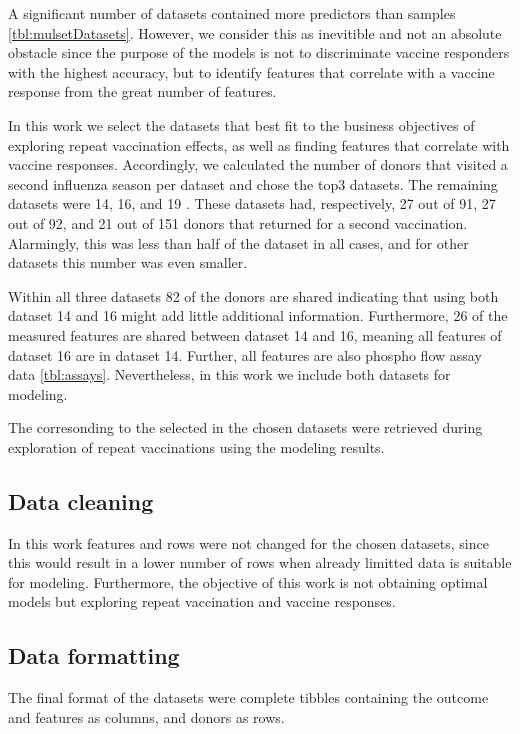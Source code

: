 A significant number of datasets contained more predictors than samples
\autoref{tbl:mulsetDatasets}. However, we consider this as inevitible and not an
absolute obstacle since the purpose of the models is not to discriminate
vaccine responders with the highest accuracy, but to identify features that
correlate with a vaccine response from the great number of features.

In this work we select the datasets that best fit to the business objectives of
exploring repeat vaccination effects, as well as finding features that
correlate with vaccine responses. Accordingly, we calculated the number of
donors that visited a second influenza season per dataset and chose the top3
datasets. The remaining datasets were 14, 16, and 19
. These datasets had,
respectively,  27 out of 91, 27 out of 92, and 21 out of 151 donors that
returned for a second vaccination. Alarmingly, this was less than half of the
dataset in all cases, and for other datasets this number was even smaller.

Within all three datasets 82 of the donors are shared indicating that using
both dataset 14 and 16 might add little additional information. Furthermore, 26
of the measured features are shared between dataset 14 and 16, meaning all
features of dataset 16 are in dataset 14. Further, all features are also
phospho flow assay data \autoref{tbl:assays}. Nevertheless, in this work we
include both datasets for modeling.

The \secondvis corresonding to the selected \firstvis in the chosen datasets
were retrieved during exploration of repeat vaccinations using the modeling
results.

\subsection{Data cleaning}

In this work features and rows were not changed for the chosen datasets, since
this would result in a lower number of rows when already limitted data is
suitable for modeling. Furthermore, the objective of this work is not
obtaining optimal models but exploring repeat vaccination and vaccine responses.

\subsection{Data formatting}

The final format of the datasets were complete tibbles containing the outcome
and features as columns, and donors as rows.

